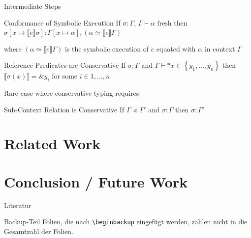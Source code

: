 \documentclass{sdqbeamer}
\newcommand{\set}[1]{\left\{ #1 \right\}}
\newcommand{\bbracket}[1]{\llbracket #1 \rrbracket}
\begin{document}
\begin{frame}[fragile]{Intermediate Steps}
  \begin{greenblock}{Conformance of Symbolic Execution}
    If $\sigma : \Gamma$, $\Gamma \vdash \alpha \text{ fresh}$ then $\sigma[x \mapsto \bbracket{e} \sigma] : \Gamma[x \mapsto \alpha],(\alpha \simeq \bbracket{e} \Gamma)$
  \end{greenblock}
  where $(\alpha \simeq \bbracket{e} \Gamma)$ is the symbolic execution of $e$ equated with $\alpha$ in context $\Gamma$
  
  \begin{greenblock}{Reference Predicates are Conservative}
    If $\sigma : \Gamma $ and $\Gamma \vdash *x \in \set{y_1, \dots, y_n}$ then $\bbracket{\sigma(x)} = \&y_i$ for some $i \in 1, \dots, n$ 
  \end{greenblock}

  Rare case where conservative typing requires 

  \begin{greenblock}{Sub-Context Relation is Conservative}
    If $\Gamma \preceq \Gamma'$ and $\sigma : \Gamma$ then $\sigma : \Gamma'$
  \end{greenblock}

\end{frame}

\section{Related Work}
\section{Conclusion / Future Work}


\appendix
\beginbackup

\begin{frame}{Literatur}
\begin{exampleblock}{Backup-Teil}
    Folien, die nach \texttt{\textbackslash beginbackup} eingefügt werden, zählen nicht in die Gesamtzahl der Folien.
\end{exampleblock}

\printbibliography
\end{frame}
\end{document}
